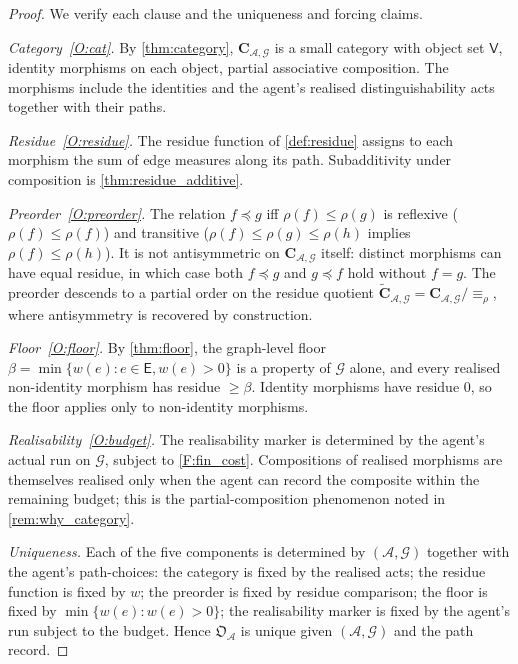 \documentclass[11pt,twocolumn,a4paper]{article}
\theoremstyle{thmstyle}
\theoremstyle{definition}
\theoremstyle{remark}
\newcommand{\Graph}{\mathcal{G}}
\newcommand{\Vrt}{\mathsf{V}}
\newcommand{\Edg}{\mathsf{E}}
\newcommand{\Agent}{\mathcal{A}}
\newcommand{\Res}{\rho}
\newcommand{\floor}{\beta}
\newcommand{\OpStr}{\mathfrak{O}}
\begin{document}
\begin{proof}
We verify each clause and the uniqueness and forcing claims.

\emph{Category~\ref{O:cat}.} By \cref{thm:category},
$\mathbf{C}_{\Agent,\Graph}$ is a small category with object set
$\Vrt$, identity morphisms on each object, partial associative
composition. The morphisms include the identities and the
agent's realised distinguishability acts together with their paths.

\emph{Residue~\ref{O:residue}.} The residue function of
\cref{def:residue} assigns to each morphism the sum of edge
measures along its path. Subadditivity under composition is
\cref{thm:residue_additive}.

\emph{Preorder~\ref{O:preorder}.} The relation $f \preceq g$ iff
$\Res(f) \leq \Res(g)$ is reflexive ($\Res(f) \leq \Res(f)$) and
transitive ($\Res(f) \leq \Res(g) \leq \Res(h)$ implies
$\Res(f) \leq \Res(h)$). It is not antisymmetric on
$\mathbf{C}_{\Agent,\Graph}$ itself: distinct morphisms can have
equal residue, in which case both $f \preceq g$ and $g \preceq f$
hold without $f = g$. The preorder descends to a partial order on
the residue quotient
$\widetilde{\mathbf{C}}_{\Agent,\Graph} = \mathbf{C}_{\Agent,
\Graph}/\!\equiv_\Res$, where antisymmetry is recovered by
construction.

\emph{Floor~\ref{O:floor}.} By \cref{thm:floor}, the graph-level
floor $\floor = \min\{w(e) : e \in \Edg, w(e) > 0\}$ is a property
of $\Graph$ alone, and every realised non-identity morphism has
residue $\geq \floor$. Identity morphisms have residue $0$, so the
floor applies only to non-identity morphisms.

\emph{Realisability~\ref{O:budget}.} The realisability marker is
determined by the agent's actual run on $\Graph$, subject to
\cref{F:fin_cost}. Compositions of realised morphisms are
themselves realised only when the agent can record the composite
within the remaining budget; this is the partial-composition
phenomenon noted in \cref{rem:why_category}.

\emph{Uniqueness.} Each of the five components is determined by
$(\Agent, \Graph)$ together with the agent's path-choices: the
category is fixed by the realised acts; the residue function is
fixed by $w$; the preorder is fixed by residue comparison; the
floor is fixed by $\min\{w(e) : w(e) > 0\}$; the realisability
marker is fixed by the agent's run subject to the budget. Hence
$\OpStr_\Agent$ is unique given $(\Agent, \Graph)$ and the path
record.


\end{proof}
\end{document}

